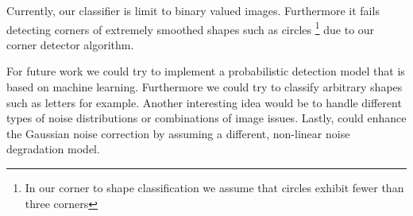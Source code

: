\documentclass[conference]{IEEEtran}
\begin{document}
Currently, our classifier is limit to binary valued images. Furthermore it fails detecting corners of extremely smoothed shapes such as circles \footnote{In our corner to shape classification we assume that circles exhibit fewer than three corners} due to our corner detector algorithm.

For future work we could try to implement a probabilistic detection model that is based on machine learning. Furthermore we could try to classify arbitrary shapes such as letters for example. Another interesting idea would be to handle different types of noise distributions or combinations of image issues. Lastly, could enhance the Gaussian noise correction by assuming a different, non-linear noise degradation model. 

\label{sec:results}

%
%



%
%
\end{document}
